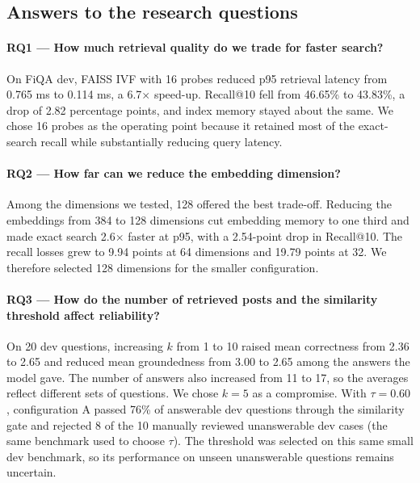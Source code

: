 \documentclass[11pt]{article}
\begin{document}
\subsection{Answers to the research questions}

\paragraph{RQ1 --- How much retrieval quality do we trade for faster search?}
On FiQA dev, FAISS IVF with 16 probes reduced p95 retrieval latency from 0.765 ms to 0.114 ms, a 6.7$\times$
speed-up. Recall@10 fell from 46.65\% to 43.83\%, a drop of 2.82 percentage points, and index memory stayed about
the same. We chose 16 probes as the operating point because it retained most of the exact-search recall while
substantially reducing query latency.

\paragraph{RQ2 --- How far can we reduce the embedding dimension?}
Among the dimensions we tested, 128 offered the best trade-off. Reducing the embeddings from 384 to 128 dimensions
cut embedding memory to one third and made exact search 2.6$\times$ faster at p95, with a 2.54-point drop in
Recall@10. The recall losses grew to 9.94 points at 64 dimensions and 19.79 points at 32. We therefore selected
128 dimensions for the smaller configuration.

\paragraph{RQ3 --- How do the number of retrieved posts and the similarity threshold affect reliability?}
On 20 dev questions, increasing $k$ from 1 to 10 raised mean correctness from 2.36 to 2.65 and reduced mean
groundedness from 3.00 to 2.65 among the answers the model gave. The number of answers also increased from 11 to
17, so the averages reflect different sets of questions. We chose $k=5$ as a compromise. With $\tau=0.60$,
configuration A passed 76\% of answerable dev questions through the similarity gate and rejected 8 of the 10
manually reviewed unanswerable dev cases (the same benchmark used to choose $\tau$). The threshold was selected on this same small dev benchmark, so its
performance on unseen unanswerable questions remains uncertain.
\end{document}
